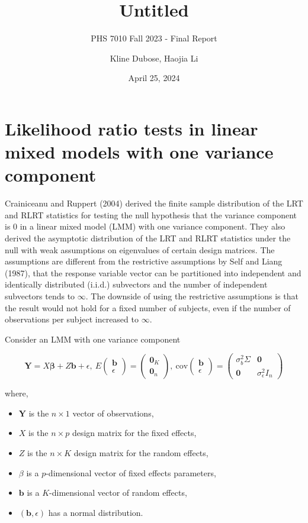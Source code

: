 \documentclass[
]{article}
\title{Untitled}
\subtitle{PHS 7010 Fall 2023 - Final Report}
\author{Kline Dubose, Haojia Li}
\date{April 25, 2024}
\providecommand{\tightlist}{%
  \setlength{\itemsep}{0pt}\setlength{\parskip}{0pt}}
\begin{document}
\maketitle

\section{Likelihood ratio tests in linear mixed models with one variance
component}\label{likelihood-ratio-tests-in-linear-mixed-models-with-one-variance-component}

Crainiceanu and Ruppert (2004) derived the finite sample distribution of
the LRT and RLRT statistics for testing the null hypothesis that the
variance component is 0 in a linear mixed model (LMM) with one variance
component. They also derived the asymptotic distribution of the LRT and
RLRT statistics under the null with weak assumptions on eigenvalues of
certain design matrices. The assumptions are different from the
restrictive assumptions by Self and Liang (1987), that the response
variable vector can be partitioned into independent and identically
distributed (i.i.d.) subvectors and the number of independent subvectors
tends to \(\infty\). The downside of using the restrictive assumptions
is that the result would not hold for a fixed number of subjects, even
if the number of observations per subject increased to \(\infty\).

Consider an LMM with one variance component

\[
\mathbf{Y} = X\mathbf{\beta} + Z\mathbf{b} + \epsilon,\
E\left(\begin{array}{c}\mathbf{b}\\\epsilon\end{array}\right) =
\left(\begin{array}{c}\mathbf{0}_K\\\mathbf{0}_n\end{array}\right),\
\text{cov}\left(\begin{array}{c}\mathbf{b}\\\epsilon\end{array}\right) = 
\left(\begin{array}{cc}\sigma_b^2 \Sigma & \mathbf{0}\\\mathbf{0} & \sigma_{\epsilon}^2 I_n\end{array}\right)
\]

where,

\begin{itemize}
\tightlist
\item
  \(\mathbf{Y}\) is the \(n \times 1\) vector of observations,
\item
  \(X\) is the \(n \times p\) design matrix for the fixed effects,
\item
  \(Z\) is the \(n \times K\) design matrix for the random effects,
\item
  \(\beta\) is a \(p\)-dimensional vector of fixed effects parameters,
\item
  \(\mathbf{b}\) is a \(K\)-dimensional vector of random effects,
\item
  \((\mathbf{b}, \epsilon)\) has a normal distribution.
\end{itemize}
\end{document}
